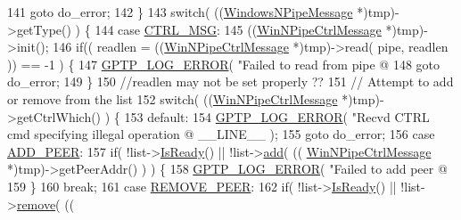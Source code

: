 \begin{DoxyCode}
{{{{141                     \textcolor{keywordflow}{goto} do\_error;
142                 \}
143                 \textcolor{keywordflow}{switch}( ((\hyperlink{class_windows_n_pipe_message}{WindowsNPipeMessage} *)tmp)->getType() ) \{
144                 \textcolor{keywordflow}{case} \hyperlink{windows__ipc_8hpp_a5a7d5ebd4af251aa73a4afcce1dc68a1a9755a42b5cc0f5f0e6afdc1f28f8857d}{CTRL\_MSG}:
145                     ((\hyperlink{class_win_n_pipe_ctrl_message}{WinNPipeCtrlMessage} *)tmp)->init();
146                     \textcolor{keywordflow}{if}(( readlen = ((\hyperlink{class_win_n_pipe_ctrl_message}{WinNPipeCtrlMessage} *)tmp)->read( pipe, readlen )) 
      == -1 ) \{
147                         \hyperlink{gptp__log_8hpp_afefbb1009717c128012bfeed94842987}{GPTP\_LOG\_ERROR}( \textcolor{stringliteral}{"Failed to read from pipe @%
148                         \textcolor{keywordflow}{goto} do\_error;
149                     \}
150                     \textcolor{comment}{//readlen may not be set properly ??}
151                     \textcolor{comment}{// Attempt to add or remove from the list}
152                     \textcolor{keywordflow}{switch}( ((\hyperlink{class_win_n_pipe_ctrl_message}{WinNPipeCtrlMessage} *)tmp)->getCtrlWhich() ) \{
153                     \textcolor{keywordflow}{default}:
154                         \hyperlink{gptp__log_8hpp_afefbb1009717c128012bfeed94842987}{GPTP\_LOG\_ERROR}( \textcolor{stringliteral}{"Recvd CTRL cmd specifying illegal operation @%
      \_\_LINE\_\_ );
155                         \textcolor{keywordflow}{goto} do\_error;
156                     \textcolor{keywordflow}{case} \hyperlink{windows__ipc_8hpp_a584396bb9236c4d39596e9f285a43313aeb15db62ee9d692bbcb21bfb7bd8af6a}{ADD\_PEER}:
157                         \textcolor{keywordflow}{if}( !list->\hyperlink{class_peer_list_a6a5257615fcc122ba0dfbfde6c8a80e5}{IsReady}() || !list->\hyperlink{class_peer_list_a318d888e6a0754f216228f6664bed3ea}{add}( ((
      \hyperlink{class_win_n_pipe_ctrl_message}{WinNPipeCtrlMessage} *)tmp)->getPeerAddr() ) ) \{
158                             \hyperlink{gptp__log_8hpp_afefbb1009717c128012bfeed94842987}{GPTP\_LOG\_ERROR}( \textcolor{stringliteral}{"Failed to add peer @%
159                         \}
160                         \textcolor{keywordflow}{break};
161                     \textcolor{keywordflow}{case} \hyperlink{windows__ipc_8hpp_a584396bb9236c4d39596e9f285a43313a0dfb7f186cb914b369e7058612fdff68}{REMOVE\_PEER}:
162                         \textcolor{keywordflow}{if}( !list->\hyperlink{class_peer_list_a6a5257615fcc122ba0dfbfde6c8a80e5}{IsReady}() || !list->\hyperlink{class_peer_list_aecf651d7b2b4ad4974fb47624a64aee7}{remove}( ((
}}}}}}}
\end{DoxyCode}
